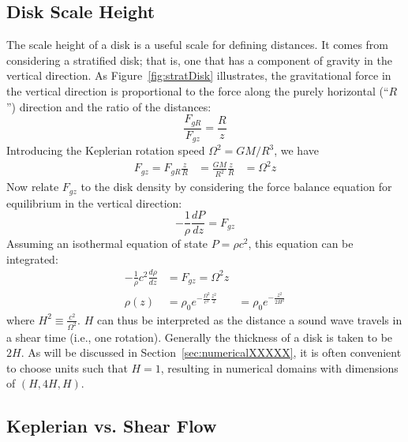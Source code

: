 \subsection{Disk Scale Height}
The scale height of a disk is a useful scale for defining distances. It comes from considering a stratified disk; that is, one that has a component of gravity in the vertical direction. As Figure~\ref{fig:stratDisk} illustrates, the gravitational force in the vertical direction is proportional to the force along the purely horizontal (``$R$'') direction and the ratio of the distances:
\begin{equation}
\frac{F_{gR}}{F_{gz}}=\frac{R}{z}
\end{equation}
Introducing the Keplerian rotation speed $\Omega^2=GM/R^3$, we have  
\begin{align*}
F_{gz}=F_{gR}\frac z R&=\frac{GM}{R^2}\frac zR
&=\Omega^2 z
\end{align*}
Now relate $F_{gz}$ to the disk density by considering the force balance equation for equilibrium in the vertical direction:
\begin{equation*}
-\frac1\rho\frac{dP}{dz}=F_{gz}
\end{equation*}
Assuming an isothermal equation of state $P=\rho c^2$, this equation can be integrated:
\begin{align*}
-\frac1\rho c^2\frac{d\rho}{dz}&=F_{gz}=\Omega^2z\\
\rho(z)&=\rho_0 e^{-\frac{\Omega^2}{c^2}\frac{z^2}2}
&=\rho_0e^{-\frac{z^2}{2H^2}}
\end{align*}
where $H^2\equiv\frac{c^2}{\Omega^2}$. $H$ can thus be interpreted as the distance a sound wave travels in a shear time (i.e., one rotation). Generally the thickness of a disk is taken to be $2H$. As will be discussed in Section~\ref{sec:numericalXXXXX}, it is often convenient to choose units such that $H=1$, resulting in numerical domains with dimensions of $(H,4H,H)$. 


\subsection{Keplerian vs. Shear Flow}

